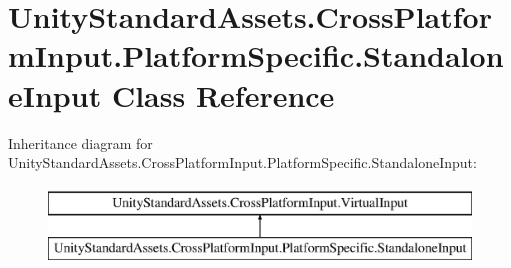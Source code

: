 \hypertarget{class_unity_standard_assets_1_1_cross_platform_input_1_1_platform_specific_1_1_standalone_input}{}\section{Unity\+Standard\+Assets.\+Cross\+Platform\+Input.\+Platform\+Specific.\+Standalone\+Input Class Reference}
\label{class_unity_standard_assets_1_1_cross_platform_input_1_1_platform_specific_1_1_standalone_input}
Inheritance diagram for Unity\+Standard\+Assets.\+Cross\+Platform\+Input.\+Platform\+Specific.\+Standalone\+Input\+:\begin{figure}[H]
\begin{center}
\leavevmode
\includegraphics[height=2.000000cm]{class_unity_standard_assets_1_1_cross_platform_input_1_1_platform_specific_1_1_standalone_input}
\end{center}
\end{figure}
